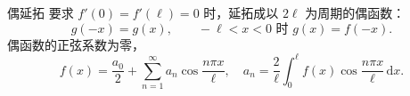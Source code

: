 \documentclass[fontset=windows, chinese, 10pt, xcolor=dvipsnames]{beamer}
\begin{document}

\begin{frame}{偶延拓}
  要求 $f'(0)=f'(\ell)=0$ 时，延拓成以 $2\ell$ 为周期的偶函数：
  \begin{equation*}
    g(-x)=g(x),
    \qquad
    -\ell<x<0 \text{ 时 } g(x)=f(-x).
  \end{equation*}
  偶函数的正弦系数为零，
  \begin{equation*}
    f(x)=\frac{a_0}{2}+\sum_{n=1}^{\infty} a_n\cos\frac{n\pi x}{\ell},
    \quad
    a_n=\frac{2}{\ell}\int_0^{\ell} f(x)\cos\frac{n\pi x}{\ell}\,\mathrm{d}x.
  \end{equation*}
\end{frame}
\end{document}

